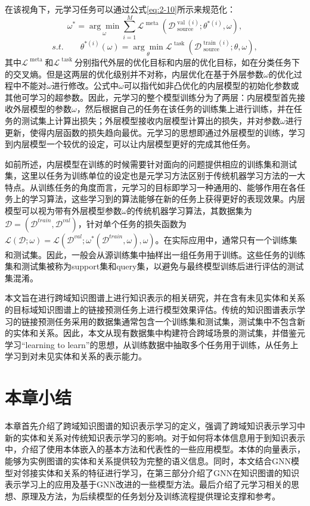   在该视角下，元学习任务可以通过公式\ref{eq:2-10}所示来规范化：
\begin{equation}
  \omega ^ { * } = \underset { \omega } { \operatorname { arg } \operatorname { min } } \sum_{i=1}^{M} \mathcal{L} ^ { \text { meta } } ( \mathcal{D} _ { \text { source } } ^ { \text { val } ( i ) } ; \theta ^ { * ( i ) } , \omega ), \label{eq:2-10}
\end{equation}
\begin{equation}
  s.t. \qquad \theta ^ { * ( i ) } ( \omega ) = \underset { \theta } { \operatorname { arg } \operatorname { min } } \mathcal{L} ^ { \text { task } } ( \mathcal{D} _ { \text { source } } ^ { \text { train } ( i ) } ; \theta , \omega ), \label{eq:2-11}
\end{equation}
其中\(\mathcal{L} ^ { \text { meta } }\)和\(\mathcal{L} ^ { \text { task } }\)分别指代外层的优化目标和内层的优化目标，如在分类任务下的交叉熵。但是这两层的优化级别并不对称，内层优化在基于外层参数\(\omega\)的优化过程中不能对\(\omega\)进行修改。公式中\(\omega\)可以指代如非凸优化\cite{finn2017model}的内层模型的初始化参数或其他可学习的超参数。因此，元学习的整个模型训练分为了两层：内层模型首先接收外层模型的参数\(\omega\)，然后根据自己的任务在该任务的训练集上进行训练，并在任务的测试集上计算出损失；外层模型接收内层模型计算出的损失，并对参数\(\omega\)进行更新，使得内层函数的损失趋向最优。元学习的思想即通过外层模型的训练，学习到内层模型一个较优的设定，可以让内层模型更好的完成其他任务。

如前所述，内层模型在训练的时候需要针对面向的问题提供相应的训练集和测试集，这里以任务为训练单位的设定也是元学习方法区别于传统机器学习方法的一大特点。从训练任务的角度而言，元学习的目标即学习一种通用的、能够作用在各任务上的学习算法，这些学习到的算法能够在新的任务上获得更好的表现效果。内层模型可以视为带有外层模型参数\(\omega\)的传统机器学习算法，其数据集为\(\mathcal{D} = (\mathcal{D}^{train}, \mathcal{D}^{val})\)，针对单个任务的损失函数为\(\mathcal{L}(\mathcal{D};\omega) = \mathcal{L}(\mathcal{D}^{val};\omega^{*}(\mathcal{D}^{train},\omega),\omega)\)。在实际应用中，通常只有一个训练集和测试集。因此，一般会从源训练集中抽样出一组任务用于训练。这些任务的训练集和测试集被称为support集和query集，以避免与最终模型训练后进行评估的测试集混淆。

本文旨在进行跨域知识图谱上进行知识表示的相关研究，并在含有未见实体和关系的目标域知识图谱上的链接预测任务上进行模型效果评估。传统的知识图谱表示学习的链接预测任务采用的数据集通常包含一个训练集和测试集，测试集中不包含新的实体和关系。因此，本文从现有数据集中构建符合跨域场景的测试集，并借鉴元学习“learning to learn”的思想，从训练数据中抽取多个任务用于训练，从任务上学习到对未见实体和关系的表示能力。

\section{本章小结}
本章首先介绍了跨域知识图谱的知识表示学习的定义，强调了跨域知识表示学习中新的实体和关系对传统知识表示学习的影响。对于如何将本体信息用于到知识表示中，介绍了使用本体嵌入的基本方法和代表性的一些应用模型。本体的向量表示，能够为实例图谱的实体和关系提供较为完整的语义信息。同时，本文结合GNN模型对邻接实体和关系的特征进行学习，在第三部分介绍了GNN在知识图谱的知识表示学习上的应用及基于GNN改进的一些模型方法。最后介绍了元学习相关的思想、原理及方法，为后续模型的任务划分及训练流程提供理论支撑和参考。